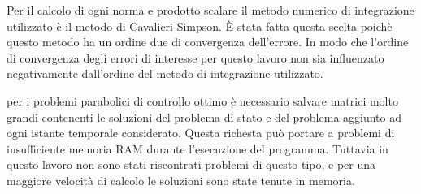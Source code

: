 Per il calcolo di ogni norma e prodotto scalare il metodo numerico di integrazione utilizzato è il metodo di Cavalieri Simpson. \MakeUppercase{è} stata fatta questa scelta poichè questo metodo ha un ordine due di convergenza dell'errore. In modo che l'ordine di convergenza degli errori di interesse per questo lavoro non sia influenzato negativamente dall'ordine del metodo di integrazione utilizzato.
\par
per i problemi parabolici di controllo ottimo è necessario salvare matrici molto grandi contenenti le soluzioni del problema di stato e del problema aggiunto ad ogni istante temporale considerato. Questa richesta può portare a problemi di insufficiente memoria RAM durante l'esecuzione del programma. Tuttavia in questo lavoro non sono stati riscontrati problemi di questo tipo, e per una maggiore velocità di calcolo le soluzioni sono state tenute in memoria.
